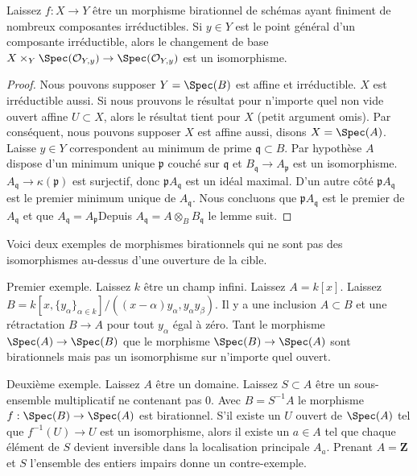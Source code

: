 \begin{lemma}

\label{lemma-birational-generic-fibres}
Laissez $f : X \to Y$ être un morphisme birationnel de schémas ayant finiment de nombreux composantes irréductibles. Si $y \in Y$ est le point général d'un composante irréductible, alors le changement de base $X \times_Y \Spec(\mathcal{O}_{Y, y}) \to \Spec(\mathcal{O}_{Y, y})$ est un isomorphisme.
\end{lemma}

\begin{proof}

Nous pouvons supposer $Y = \Spec(B)$ est affine et irréductible. $X$ est irréductible aussi. Si nous prouvons le résultat pour n'importe quel non vide ouvert affine $U \subset X$, alors le résultat tient pour $X$
(petit argument omis). Par conséquent, nous pouvons supposer $X$
est affine aussi, disons $X = \Spec(A)$. Laisse $y \in Y$ correspondent au minimum de prime $\mathfrak q \subset B$. Par hypothèse $A$ dispose d'un minimum unique $\mathfrak p$ couché sur $\mathfrak q$ et $B_\mathfrak q \to A_\mathfrak p$ est un isomorphisme. $A_\mathfrak q \to \kappa(\mathfrak p)$ est surjectif, donc $\mathfrak p A_\mathfrak q$ est un idéal maximal. D'un autre côté
$\mathfrak p A_\mathfrak q$ est le premier minimum unique de $A_\mathfrak q$. Nous concluons que $\mathfrak p A_\mathfrak q$ est le premier de
$A_\mathfrak q$ et que $A_\mathfrak q = A_\mathfrak p$Depuis
$A_\mathfrak q = A \otimes_B B_\mathfrak q$ le lemme suit.

\end{proof}

\begin{example}

\label{example-birational-not-iso-over-open}
Voici deux exemples de morphismes birationnels qui ne sont pas des isomorphismes au-dessus d'une ouverture de la cible.

\medskip\noindent
Premier exemple. Laissez $k$ être un champ infini. Laissez $A = k[x]$. Laissez $B = k[x, \{y_{\alpha}\}_{\alpha \in k}]/
((x-\alpha)y_\alpha, y_\alpha y_\beta)$. Il y a une inclusion $A \subset B$ et une rétractation $B \to A$ pour tout $y_\alpha$ égal à zéro. Tant le morphisme $\Spec(A) \to \Spec(B)$ que le morphisme $\Spec(B) \to \Spec(A)$ sont birationnels mais pas un isomorphisme sur n'importe quel ouvert.

\medskip\noindent
Deuxième exemple. Laissez $A$ être un domaine. Laissez $S \subset A$ être un sous-ensemble multiplicatif ne contenant pas $0$. Avec $B = S^{-1}A$ le morphisme $f : \Spec(B) \to \Spec(A)$ est birationnel. S'il existe un $U$ ouvert de $\Spec(A)$ tel que $f^{-1}(U) \to U$ est un isomorphisme, alors il existe un $a \in A$ tel que chaque élément de $S$ devient inversible dans la localisation principale $A_a$. Prenant $A = \mathbf{Z}$ et $S$ l'ensemble des entiers impairs donne un contre-exemple.
\end{example}

